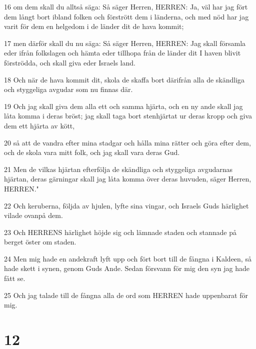 \par 16 om dem skall du alltså säga: Så säger Herren, HERREN: Ja, väl har jag fört dem långt bort ibland folken och förstrött dem i länderna, och med nöd har jag varit för dem en helgedom i de länder dit de hava kommit;
\par 17 men därför skall du nu säga: Så säger Herren, HERREN: Jag skall församla eder ifrån folkslagen och hämta eder tillhopa från de länder dit I haven blivit förströdda, och skall giva eder Israels land.
\par 18 Och när de hava kommit dit, skola de skaffa bort därifrån alla de skändliga och styggeliga avgudar som nu finnas där.
\par 19 Och jag skall giva dem alla ett och samma hjärta, och en ny ande skall jag låta komma i deras bröst; jag skall taga bort stenhjärtat ur deras kropp och giva dem ett hjärta av kött,
\par 20 så att de vandra efter mina stadgar och hålla mina rätter och göra efter dem, och de skola vara mitt folk, och jag skall vara deras Gud.
\par 21 Men de vilkas hjärtan efterfölja de skändliga och styggeliga avgudarnas hjärtan, deras gärningar skall jag låta komma över deras huvuden, säger Herren, HERREN."
\par 22 Och keruberna, följda av hjulen, lyfte sina vingar, och Israels Guds härlighet vilade ovanpå dem.
\par 23 Och HERRENS härlighet höjde sig och lämnade staden och stannade på berget öster om staden.
\par 24 Men mig hade en andekraft lyft upp och fört bort till de fångna i Kaldeen, så hade skett i synen, genom Guds Ande. Sedan försvann för mig den syn jag hade fått se.
\par 25 Och jag talade till de fångna alla de ord som HERREN hade uppenbarat för mig.

\chapter{12}

